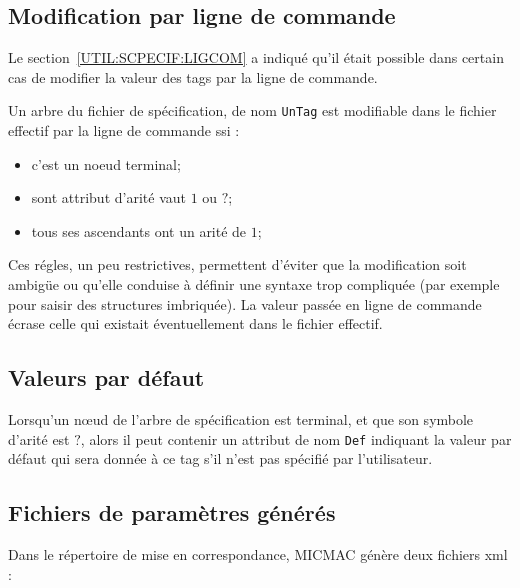
\subsection{Modification par ligne de commande}

\label{DU:Modif:LC}

Le section~\ref{UTIL:SCPECIF:LIGCOM} a indiqu\'e qu'il
\'etait possible dans certain cas de modifier la valeur
des tags par la ligne de commande.

Un arbre du fichier de sp\'ecification, de nom {\tt UnTag}  
est modifiable dans le fichier effectif par la ligne
de commande ssi :

\begin{itemize}
   \item c'est un noeud terminal;
   \item sont attribut d'arit\'e vaut $1$ ou $?$;
   \item tous ses ascendants ont un arit\'e de $1$;
\end{itemize}

Ces r\'egles, un peu restrictives, permettent d'\'eviter 
que la modification soit ambig\"ue ou qu'elle conduise \`a
d\'efinir une syntaxe trop compliqu\'ee (par exemple pour
saisir des structures imbriqu\'ee).
La valeur pass\'ee en ligne de commande \'ecrase celle
qui existait \'eventuellement dans le fichier effectif.


\subsection{Valeurs par d\'efaut}

\label{Val:Def}

Lorsqu'un  n\oe{}ud de l'arbre de sp\'ecification 
est terminal, et que son symbole d'arit\'e est $?$,
alors il peut contenir un attribut de nom {\tt Def}
indiquant la valeur par d\'efaut qui sera donn\'ee
\`a ce tag s'il n'est pas sp\'ecifi\'e par l'utilisateur.


\subsection{Fichiers de param\`etres g\'en\'er\'es}


Dans le r\'epertoire  de mise en correspondance, MICMAC
g\'en\`ere deux fichiers xml :

